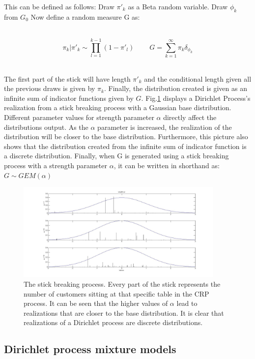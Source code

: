 \documentclass[twoside,hidelinks]{article}
\begin{document}
This can be defined as follows: Draw $\pi'_k$ as a Beta random variable. Draw $\phi_k$ from $G_0$ Now define a random measure G as:


\ \
\begin{equation}
\pi_k  | \pi'_k \sim \prod_{l=1}^{k-1}(1- \pi'_l) \ \ \ \ \ \ \ \ \ \     G = \sum_{k=1}^\infty \pi_k \delta_{\phi_k} 
\end{equation}
\ \

The first part of the stick will have length $\pi'_k$ and the conditional length given all the previous draws is given by $\pi_k$. Finally, the distribution created is given as an infinite sum of indicator functions given by $G$. Fig.\ref{crpGausBase} displays a Dirichlet Process's realization from a stick breaking process with a Gaussian base distribution. Different parameter values for strength parameter $\alpha$ directly affect the distributions output. As the $\alpha$ parameter is increased, the realization of the distribution will be closer to the base distribution. Furthermore, this picture also shows that the distribution created from the infinite sum of indicator function is a discrete distribution. Finally, when G is generated using a stick breaking process with a strength parameter $\alpha$, it can be written in shorthand as: $ G \sim GEM(\alpha) $

\begin{figure}[h!]
          \centerline{\includegraphics[width=0.91\textwidth]{stickBreakGaus}}
	\caption{The stick breaking process. Every part of the stick represents the number of customers sitting at that specific table in the CRP process. It can be seen that the higher values of $\alpha$ lead to realizations that are closer to the base distribution. It is clear that realizations of a Dirichlet process are discrete distributions.}
	\label{crpGausBase}
\end{figure}

\subsection{Dirichlet process mixture models}
\end{document}
